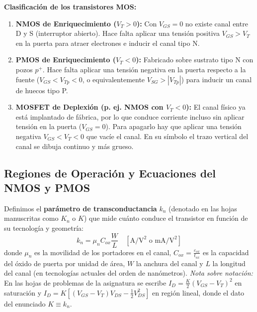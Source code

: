 \textbf{Clasificación de los transistores MOS:}
\begin{enumerate}[leftmargin=*]
    \item \textbf{NMOS de Enriquecimiento ($V_T > 0$):} Con $V_{GS} = 0$ no existe canal entre D y S (interruptor abierto). Hace falta aplicar una tensión positiva $V_{GS} > V_T$ en la puerta para atraer electrones e inducir el canal tipo N.
    \item \textbf{PMOS de Enriquecimiento ($V_T < 0$):} Fabricado sobre sustrato tipo N con pozos $p^+$. Hace falta aplicar una tensión negativa en la puerta respecto a la fuente ($V_{GS} < V_{Tp} < 0$, o equivalentemente $V_{SG} > |V_{Tp}|$) para inducir un canal de huecos tipo P.
    \item \textbf{MOSFET de Deplexión (p. ej. NMOS con $V_T < 0$):} El canal físico ya está implantado de fábrica, por lo que conduce corriente incluso sin aplicar tensión en la puerta ($V_{GS} = 0$). Para apagarlo hay que aplicar una tensión negativa $V_{GS} < V_T < 0$ que vacíe el canal. En su símbolo el trazo vertical del canal se dibuja continuo y más grueso.
\end{enumerate}

\begin{center}
\end{center}

\subsection{Regiones de Operación y Ecuaciones del NMOS y PMOS}
Definimos el \textbf{parámetro de transconductancia} $k_n$ (denotado en las hojas manuscritas como $K_n$ o $K$) que mide cuánto conduce el transistor en función de su tecnología y geometría:
\begin{equation}
    k_n = \mu_n C_{ox} \frac{W}{L} \quad \left[\si{\ampere\per\volt\squared} \text{ o } \si{\milli\ampere\per\volt\squared}\right]
\end{equation}
donde $\mu_n$ es la movilidad de los portadores en el canal, $C_{ox} = \frac{\varepsilon_{ox}}{t_{ox}}$ es la capacidad del óxido de puerta por unidad de área, $W$ la anchura del canal y $L$ la longitud del canal (en tecnologías actuales del orden de nanómetros).
\emph{Nota sobre notación:} En las hojas de problemas de la asignatura se escribe $I_D = \frac{K}{2}(V_{GS}-V_T)^2$ en saturación y $I_D = K\left[(V_{GS}-V_T)V_{DS} - \frac{1}{2}V_{DS}^2\right]$ en región lineal, donde el dato del enunciado $K \equiv k_n$.

